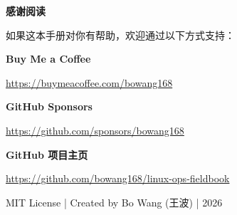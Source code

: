 \documentclass[11pt,a4paper,openany]{report}
\begin{document}
\cleardoublepage
\thispagestyle{empty}
\begin{center}
\vspace*{6cm}
{\Large\bfseries 感谢阅读}

\vspace{1cm}
{\normalsize 如果这本手册对你有帮助，欢迎通过以下方式支持：}

\vspace{1cm}
{\large \textcolor{linkcolor}{\textbf{Buy Me a Coffee}}}

{\normalsize \url{https://buymeacoffee.com/bowang168}}

\vspace{0.8cm}
{\large \textcolor{linkcolor}{\textbf{GitHub Sponsors}}}

{\normalsize \url{https://github.com/sponsors/bowang168}}

\vspace{0.8cm}
{\large \textcolor{linkcolor}{\textbf{GitHub 项目主页}}}

{\normalsize \url{https://github.com/bowang168/linux-ops-fieldbook}}

\vspace{2cm}
{\small MIT License | Created by Bo Wang (王波) | 2026}
\end{center}
\end{document}
